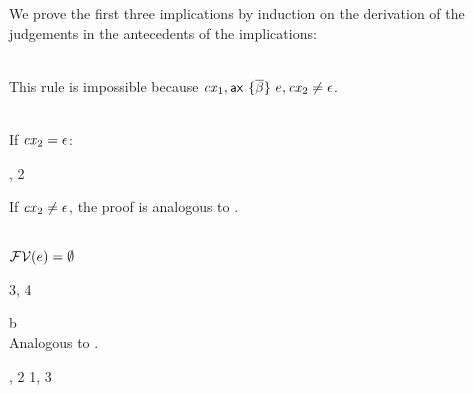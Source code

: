 We prove the first three implications by induction on the derivation of the
judgements in the antecedents of the implications:

\begin{bycase}

\Case{\Rcxmt}\\
This rule is impossible because $\mathit{cx}_1,\mathsf{ax}\ \{\overline{\beta}\}\ e,\mathit{cx}_2\neq\epsilon$.

\Case{\Rcxtdec, \Rcxodec, \Rcxlem, \Rcxtvdec, \Rcxvdec}
\begin{derivation}
\steP{\cx_2\neq\mtcx}
\end{derivation}

\Case{\Rcxax}\\
If $\mathit{cx}_2=\epsilon$:
\begin{derivation}
     {\indhyp, 2}
\end{derivation}
If $\mathit{cx}_2\neq\epsilon$, the proof is analogous to \Rcxtdec.

\Case{\Reop, \Redesc, \Reproj}\\
$\mathcal{FV}(e)=\emptyset$

\Case{\Revar}
\begin{derivation}
\step{\vdecO\in\cx}{\premof{\Revar}}
\end{derivation}

\Case{\Reapp}
\begin{derivation}
     {3, 4}
\end{derivation}
b
\Case{\Reeq, \Reif, \Resuper, \Resub}\\
Analogous to \Reapp.

\Case{\Reabs}
\begin{derivation}
\step{\efvar{\expr}\subseteq\cxvar{\snoc{\cx}{\vdecO}}}{\indhyp}
\end{derivation}
\Case{\Reabsalpha}
\begin{derivation}
\step{\efvar{\absO}\subseteq\cxvarO}{\indhyp}
     {, 2}
     {1, 3}
\end{derivation}


\end{bycase}
